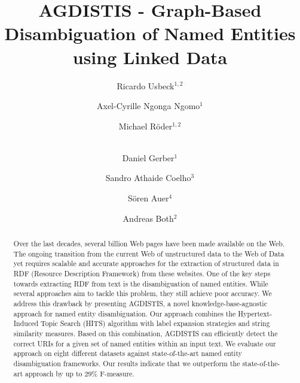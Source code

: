 \documentclass{llncs}
\begin{document}
\title{AGDISTIS - Graph-Based Disambiguation of Named Entities using Linked Data}

\author{
Ricardo Usbeck$^{1,2}$ \and 
Axel-Cyrille Ngonga Ngomo$^{1}$ \and
Michael R\"oder$^{1,2}$ \and \\
Daniel Gerber$^{1}$ \and
Sandro Athaide Coelho$^{3}$ \and
S\"oren Auer$^{4}$ \and
Andreas Both$^{2}$
}

\maketitle


\begin{abstract}
Over the last decades, several billion Web pages have been made available on the Web.
The ongoing transition from the current Web of unstructured data to the Web of Data yet requires scalable and accurate approaches for the extraction of structured data in RDF (Resource Description Framework) from these websites.
One of the key steps towards extracting RDF from text is the disambiguation of named entities.
While several approaches aim to tackle this problem, they still achieve poor accuracy. %
We address this drawback by presenting AGDISTIS, a novel knowledge-base-agnostic approach for named entity disambiguation.
Our approach combines the Hypertext-Induced Topic Search (HITS) algorithm with label expansion strategies and string similarity measures.
Based on this combination, AGDISTIS can efficiently detect the correct URIs for a given set of named entities within an input text. 
We evaluate our approach on eight different datasets against state-of-the-art named entity disambiguation frameworks.
Our results indicate that we outperform the state-of-the-art approach by up to $29\%$ F-measure.
\end{abstract}
\end{document}
